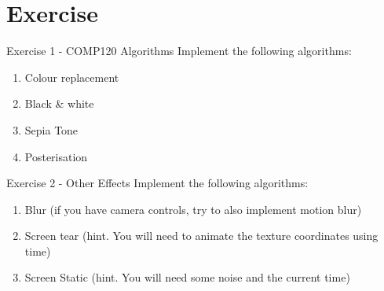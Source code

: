 \part{Exercise}
\frame{\partpage}

\begin{frame}{Exercise 1 - COMP120 Algorithms}
	Implement the following algorithms:
	\begin{enumerate}
		\item Colour replacement
		\item Black \& white
		\item Sepia Tone
		\item Posterisation
	\end{enumerate}
\end{frame}

\begin{frame}{Exercise 2 - Other Effects}
	Implement the following algorithms:
	\begin{enumerate}
		\item Blur (if you have camera controls, try to also implement motion blur)
		\item Screen tear (hint. You will need to animate the texture coordinates using time)
		\item Screen Static (hint. You will need some noise and the current time)
	\end{enumerate}	
\end{frame}